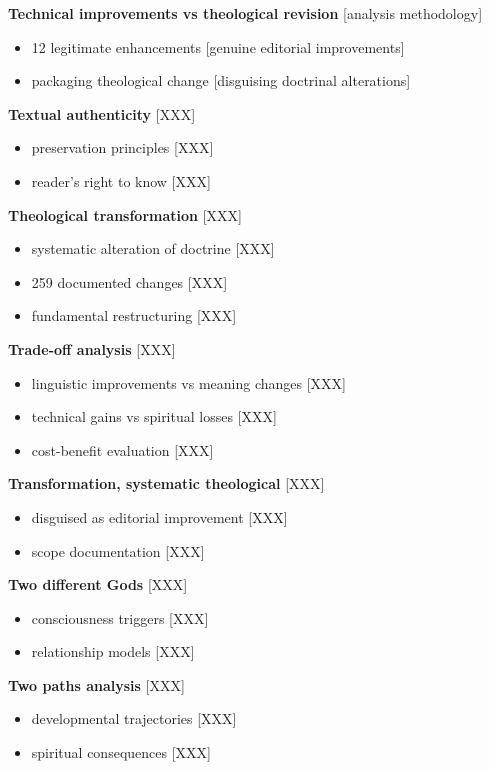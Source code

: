 \documentclass[11pt,twoside]{book}
\begin{document}
\textbf{\textbf{Technical improvements vs theological revision}} {[}analysis methodology]
\begin{itemize}
\item 12 legitimate enhancements [genuine editorial improvements]
\item packaging theological change [disguising doctrinal alterations]
\end{itemize}

\textbf{\textbf{Textual authenticity}} {[}XXX]
\begin{itemize}
\item preservation principles [XXX]
\item reader's right to know [XXX]
\end{itemize}

\textbf{\textbf{Theological transformation}} {[}XXX]
\begin{itemize}
\item systematic alteration of doctrine [XXX]
\item 259 documented changes [XXX]
\item fundamental restructuring [XXX]
\end{itemize}

\textbf{\textbf{Trade-off analysis}} {[}XXX]
\begin{itemize}
\item linguistic improvements vs meaning changes [XXX]
\item technical gains vs spiritual losses [XXX]
\item cost-benefit evaluation [XXX]
\end{itemize}

\textbf{\textbf{Transformation, systematic theological}} {[}XXX]
\begin{itemize}
\item disguised as editorial improvement [XXX]
\item scope documentation [XXX]
\end{itemize}

\textbf{\textbf{Two different Gods}} {[}XXX]
\begin{itemize}
\item consciousness triggers [XXX]
\item relationship models [XXX]
\end{itemize}

\textbf{\textbf{Two paths analysis}} {[}XXX]
\begin{itemize}
\item developmental trajectories [XXX]
\item spiritual consequences [XXX]
\end{itemize}
\end{document}
